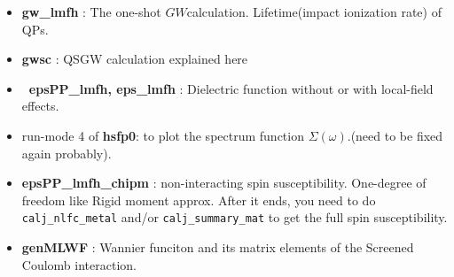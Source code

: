 \documentclass[a4paper,10pt,epsf,fleqn]{article}
\newcommand{\GW}{$GW$}
\begin{document}
{\begin{itemize}
\item
{\bf gw\_lmfh} : The one-shot \GW calculation. 
     Lifetime(impact ionization rate) of QPs.

\item
{\bf gwsc} : QSGW calculation explained here

\item
{\bf \ epsPP\_lmfh, eps\_lmfh} : Dielectric function without or with local-field effects.

\item
 run-mode 4 of {\bf hsfp0}: to plot the spectrum function
     $\Sigma(\omega)$.(need to be fixed again probably). 


\item
{\bf epsPP\_lmfh\_chipm} : non-interacting spin susceptibility. 
One-degree of freedom like Rigid moment approx.
After it ends, you need to do \verb#calj_nlfc_metal# and/or \verb#calj_summary_mat#
to get the full spin susceptibility.

\item
{\bf genMLWF} : Wannier funciton and its matrix elements of the Screened
     Coulomb interaction.

\end{itemize}






}
\end{document}
